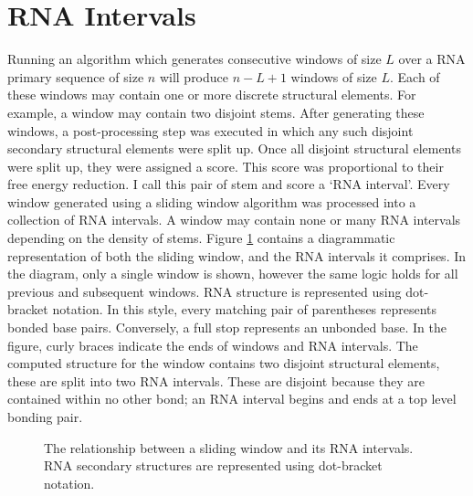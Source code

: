 \documentclass{cshonours}
\begin{document}
\section{RNA Intervals}
Running an algorithm which generates consecutive windows of size $L$ over a RNA primary sequence of size $n$ will produce $n-L+1$ windows of size $L$. Each of these windows may contain one or more discrete structural elements. For example, a window may contain two disjoint stems. After generating these windows, a post-processing step was executed in which any such disjoint secondary structural elements were split up. Once all disjoint structural elements were split up, they were assigned a score. This score was proportional to their free energy reduction. I call this pair of stem and score a `RNA interval'. Every window generated using a sliding window algorithm was processed into a collection of RNA intervals. A window may contain none or many RNA intervals depending on the density of stems. Figure \ref{fig:rnainterval} contains a diagrammatic representation of both the sliding window, and the RNA intervals it comprises. In the diagram, only a single window is shown, however the same logic holds for all previous and subsequent windows. RNA structure is represented using dot-bracket notation. In this style, every matching pair of parentheses represents bonded base pairs. Conversely, a full stop represents an unbonded base. In the figure, curly braces indicate the ends of windows and RNA intervals. The computed structure for the window contains two disjoint structural elements, these are split into two RNA intervals. These are disjoint because they are contained within no other bond; an RNA interval begins and ends at a top level bonding pair.


\begin{figure}
\begin{center}
\end{center}
\caption{The relationship between a sliding window and its RNA intervals. RNA secondary structures are represented using dot-bracket notation.}
\label{fig:rnainterval}
\end{figure}
\end{document}
